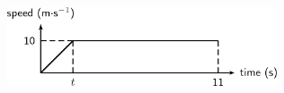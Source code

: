 \begin{enumerate}[noitemsep, label=\textbf{\arabic*}. ]
	\begin{figure}[H] %
    \begin{center}
    \label{m38796*id81821!!!underscore!!!media}\label{m38796*id81821!!!underscore!!!printimage}\includegraphics[width=300px]{col11305.imgs/m38796_PG10C2_052.png} %
        
      \vspace{2pt}
    \vspace{.1in}
    
    \end{center}

 \end{figure}   

    \addtocounter{footnote}{-0}
    

\end{enumerate}
